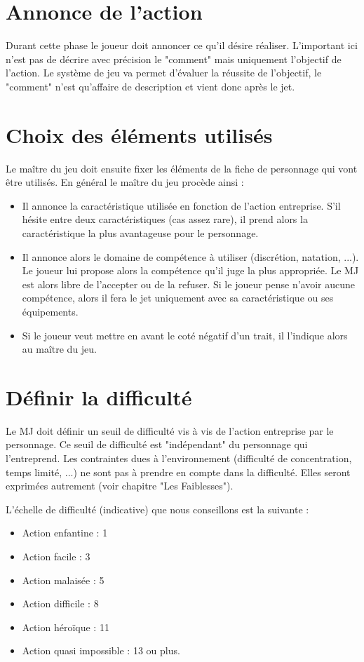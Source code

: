 \documentclass{conf/FusinaClass}
\begin{document}
\section{Annonce de l'action}
Durant cette phase le joueur doit annoncer ce qu'il désire réaliser. L'important ici n'est pas de décrire avec précision le "comment" mais uniquement l'objectif de l'action. Le système de jeu va permet d'évaluer la réussite de l'objectif, le "comment" n'est qu'affaire de description et vient donc après le jet.

\section{Choix des éléments utilisés}
Le maître du jeu doit ensuite fixer les éléments de la fiche de personnage qui vont être utilisés. En général le maître du jeu procède ainsi :

\begin{itemize}
\item Il annonce la caractéristique utilisée en fonction de l'action entreprise. S'il hésite entre deux caractéristiques (cas assez rare), il prend alors la caractéristique la plus avantageuse pour le personnage.
\item Il annonce alors le domaine de compétence à utiliser (discrétion, natation, ...). Le joueur lui propose alors la compétence qu'il juge la plus appropriée. Le MJ est alors libre de l'accepter ou de la refuser. Si le joueur pense n'avoir aucune compétence, alors il fera le jet uniquement avec sa caractéristique ou ses équipements.
\item Si le joueur veut mettre en avant le coté négatif d'un trait, il l'indique alors au maître du jeu.
\end{itemize}

\section{Définir la difficulté}
Le MJ doit définir un seuil de difficulté vis à vis de l'action entreprise par le personnage. Ce seuil de difficulté est "indépendant" du personnage qui l'entreprend. Les contraintes dues à l'environnement (difficulté de concentration, temps limité, ...) ne sont pas à prendre en compte dans la difficulté. Elles seront exprimées autrement (voir chapitre "Les Faiblesses").

L'échelle de difficulté (indicative) que nous conseillons est la suivante :

\begin{itemize}
\item Action enfantine : 1
\item Action facile : 3
\item Action malaisée : 5
\item Action difficile : 8
\item Action héroïque : 11
\item Action quasi impossible : 13 ou plus.
\end{itemize}
\end{document}
